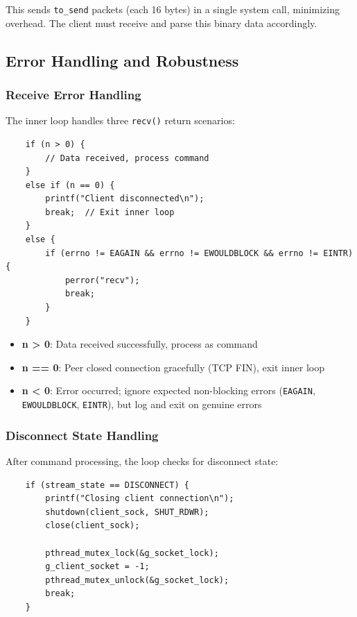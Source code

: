 This sends \texttt{to\_send} packets (each 16 bytes) in a single system call, minimizing overhead. The client must receive and parse this binary data accordingly.

\subsection{Error Handling and Robustness}

\subsubsection{Receive Error Handling}

The inner loop handles three \texttt{recv()} return scenarios:

\begin{verbatim}
	if (n > 0) {
		// Data received, process command
	}
	else if (n == 0) {
		printf("Client disconnected\n");
		break;  // Exit inner loop
	}
	else {
		if (errno != EAGAIN && errno != EWOULDBLOCK && errno != EINTR) {
			perror("recv");
			break;
		}
	}
\end{verbatim}

\begin{itemize}
	\item \textbf{n > 0}: Data received successfully, process as command
	\item \textbf{n == 0}: Peer closed connection gracefully (TCP FIN), exit inner loop
	\item \textbf{n < 0}: Error occurred; ignore expected non-blocking errors (\texttt{EAGAIN}, \texttt{EWOULDBLOCK}, \texttt{EINTR}), but log and exit on genuine errors
\end{itemize}

\subsubsection{Disconnect State Handling}

After command processing, the loop checks for disconnect state:

\begin{verbatim}
	if (stream_state == DISCONNECT) {
		printf("Closing client connection\n");
		shutdown(client_sock, SHUT_RDWR);
		close(client_sock);
		
		pthread_mutex_lock(&g_socket_lock);
		g_client_socket = -1;
		pthread_mutex_unlock(&g_socket_lock);
		break;
	}
\end{verbatim}


